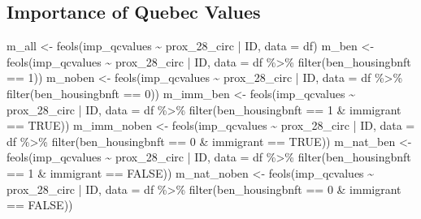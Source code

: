 \documentclass[
  letterpaper,
  DIV=11,
  numbers=noendperiod]{scrartcl}
\newenvironment{Shaded}{\begin{snugshade}}{\end{snugshade}}
\newcommand{\AttributeTok}[1]{\textcolor[rgb]{0.40,0.45,0.13}{#1}}
\newcommand{\ConstantTok}[1]{\textcolor[rgb]{0.56,0.35,0.01}{#1}}
\newcommand{\DecValTok}[1]{\textcolor[rgb]{0.68,0.00,0.00}{#1}}
\newcommand{\FunctionTok}[1]{\textcolor[rgb]{0.28,0.35,0.67}{#1}}
\newcommand{\NormalTok}[1]{\textcolor[rgb]{0.00,0.23,0.31}{#1}}
\newcommand{\OtherTok}[1]{\textcolor[rgb]{0.00,0.23,0.31}{#1}}
\newcommand{\SpecialCharTok}[1]{\textcolor[rgb]{0.37,0.37,0.37}{#1}}
\begin{document}
\hypertarget{importance-of-quebec-values}{%
\subsection{Importance of Quebec
Values}\label{importance-of-quebec-values}}

\begin{Shaded}
\begin{Highlighting}[]
\NormalTok{m\_all }\OtherTok{\textless{}{-}} \FunctionTok{feols}\NormalTok{(imp\_qcvalues }\SpecialCharTok{\textasciitilde{}}\NormalTok{ prox\_28\_circ }\SpecialCharTok{|}\NormalTok{ ID, }\AttributeTok{data =}\NormalTok{ df)}
\NormalTok{m\_ben }\OtherTok{\textless{}{-}} \FunctionTok{feols}\NormalTok{(imp\_qcvalues }\SpecialCharTok{\textasciitilde{}}\NormalTok{ prox\_28\_circ }\SpecialCharTok{|}\NormalTok{ ID,}
               \AttributeTok{data =}\NormalTok{ df }\SpecialCharTok{\%\textgreater{}\%} \FunctionTok{filter}\NormalTok{(ben\_housingbnft }\SpecialCharTok{==} \DecValTok{1}\NormalTok{))}
\NormalTok{m\_noben }\OtherTok{\textless{}{-}} \FunctionTok{feols}\NormalTok{(imp\_qcvalues }\SpecialCharTok{\textasciitilde{}}\NormalTok{ prox\_28\_circ }\SpecialCharTok{|}\NormalTok{ ID,}
                 \AttributeTok{data =}\NormalTok{ df }\SpecialCharTok{\%\textgreater{}\%} \FunctionTok{filter}\NormalTok{(ben\_housingbnft }\SpecialCharTok{==} \DecValTok{0}\NormalTok{))}
\NormalTok{m\_imm\_ben }\OtherTok{\textless{}{-}} \FunctionTok{feols}\NormalTok{(imp\_qcvalues }\SpecialCharTok{\textasciitilde{}}\NormalTok{ prox\_28\_circ }\SpecialCharTok{|}\NormalTok{ ID,}
                   \AttributeTok{data =}\NormalTok{ df }\SpecialCharTok{\%\textgreater{}\%} \FunctionTok{filter}\NormalTok{(ben\_housingbnft }\SpecialCharTok{==} \DecValTok{1} \SpecialCharTok{\&}\NormalTok{ immigrant }\SpecialCharTok{==} \ConstantTok{TRUE}\NormalTok{))}
\NormalTok{m\_imm\_noben }\OtherTok{\textless{}{-}} \FunctionTok{feols}\NormalTok{(imp\_qcvalues }\SpecialCharTok{\textasciitilde{}}\NormalTok{ prox\_28\_circ }\SpecialCharTok{|}\NormalTok{ ID,}
                     \AttributeTok{data =}\NormalTok{ df }\SpecialCharTok{\%\textgreater{}\%} \FunctionTok{filter}\NormalTok{(ben\_housingbnft }\SpecialCharTok{==} \DecValTok{0} \SpecialCharTok{\&}\NormalTok{ immigrant }\SpecialCharTok{==} \ConstantTok{TRUE}\NormalTok{))}
\NormalTok{m\_nat\_ben }\OtherTok{\textless{}{-}} \FunctionTok{feols}\NormalTok{(imp\_qcvalues }\SpecialCharTok{\textasciitilde{}}\NormalTok{ prox\_28\_circ }\SpecialCharTok{|}\NormalTok{ ID,}
                   \AttributeTok{data =}\NormalTok{ df }\SpecialCharTok{\%\textgreater{}\%} \FunctionTok{filter}\NormalTok{(ben\_housingbnft }\SpecialCharTok{==} \DecValTok{1} \SpecialCharTok{\&}\NormalTok{ immigrant }\SpecialCharTok{==} \ConstantTok{FALSE}\NormalTok{))}
\NormalTok{m\_nat\_noben }\OtherTok{\textless{}{-}} \FunctionTok{feols}\NormalTok{(imp\_qcvalues }\SpecialCharTok{\textasciitilde{}}\NormalTok{ prox\_28\_circ }\SpecialCharTok{|}\NormalTok{ ID,}
                     \AttributeTok{data =}\NormalTok{ df }\SpecialCharTok{\%\textgreater{}\%} \FunctionTok{filter}\NormalTok{(ben\_housingbnft }\SpecialCharTok{==} \DecValTok{0} \SpecialCharTok{\&}\NormalTok{ immigrant }\SpecialCharTok{==} \ConstantTok{FALSE}\NormalTok{))}


\end{Highlighting}
\end{Shaded}
\end{document}
